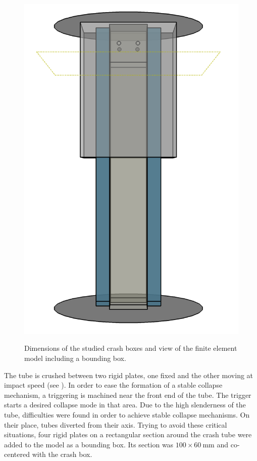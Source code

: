 \documentclass[cmfonts]{witpress}
\begin{document}
\begin{figure}[ht]
\begin{minipage}[b]{.48\linewidth}
    \label{fig:crash_box}
  \end{minipage}
  \hfill
  \begin{minipage}[b]{.48\linewidth}
    \centering
    \includegraphics[width=0.9\linewidth]{figures/IMG_CUTRES/general_transp}
    \label{fig:general}
  \end{minipage}
  \caption{Dimensions of the studied crash boxes and view of the finite element model including a bounding box.}
  \label{fig:modelo}
\end{figure}

The tube is crushed between two rigid plates, one fixed and the other moving at impact speed (see ). In order to ease the formation of a stable collapse mechanism, a triggering is machined near the front end of the tube. The trigger starts a desired collapse mode in that area. Due to the high slenderness of the tube, difficulties were found in order to achieve stable collapse mechanisms. On their place, tubes diverted from their axis. Trying to avoid these critical situations, four rigid plates on a rectangular section around the crash tube were added to the model as a bounding box. Its section was $\num{100}\times\SI{60}{\mm}$ and co-centered with the crash box.
\end{document}
